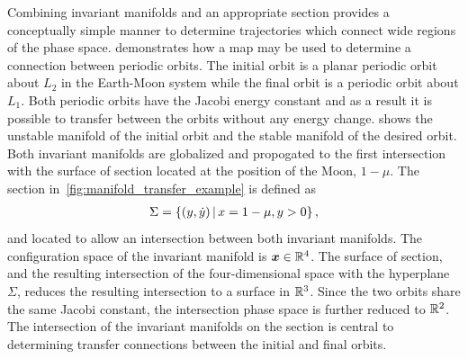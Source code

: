 \documentclass[preprint]{elsarticle}
\begin{document}
Combining invariant manifolds and an appropriate \Poincare section provides a conceptually simple manner to determine trajectories which connect wide regions of the phase space.
 demonstrates how a \Poincare map may be used to determine a connection between periodic orbits.
The initial orbit is a planar periodic orbit about \( L_2 \) in the Earth-Moon system while the final orbit is a periodic orbit about \( L_1 \).
Both periodic orbits have the Jacobi energy constant and as a result it is possible to transfer between the orbits without any energy change.
 shows the unstable manifold of the initial orbit and the stable manifold of the desired orbit. 
Both invariant manifolds are globalized and propogated to the first intersection with the \Poincare surface of section located at the position of the Moon, \( 1 - \mu \).
The \Poincare section in~\cref{fig:manifold_transfer_example} is defined as
\begin{align*}
	\Sigma = \left\{  ( y, \dot{y}) \, | \, x = 1- \mu, y > 0 \right\} , 
\end{align*}
and located to allow an intersection between both invariant manifolds.
The configuration space of the invariant manifold is \( \boldsymbol{x} \in \mathbb{R}^4 \).
The surface of section, and the resulting intersection of the four-dimensional space with the hyperplane \( \Sigma \), reduces the resulting intersection to a surface in \( \mathbb{R}^3\).
Since the two orbits share the same Jacobi constant, the intersection phase space is further reduced to \( \mathbb{R}^2\).
The intersection of the invariant manifolds on the \Poincare section is central to determining transfer connections between the initial and final orbits.
\end{document}
